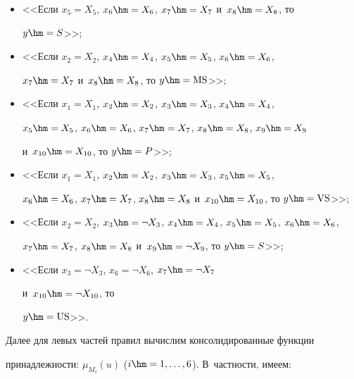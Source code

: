 \begin{itemize}  

\item[$e_1$:] <<Если $x_5=X_5$, $x_6\hm=X_6$, $x_7\hm=X_7$ и~$x_8\hm=X_8$, то 

$y\hm=S$>>; 

  

\item[$e_2$:] <<Если $x_2 = X_2$, $x_4 \hm=X_4$, $x_5\hm=X_5$, $x_6\hm=X_6$, 

$x_7\hm=X_7$ и~$x_8\hm=X_8$, то $y\hm= \mathrm{MS}$>>; 

  

\item[$e_3$:] <<Если $x_1 = X_1$, $x_2\hm=X_2$, $x_3\hm= X_3$, $x_4\hm= X_4$, 

$x_5\hm=X_5$, $x_6\hm= X_6$, $x_7 \hm= X_7$, $x_8\hm=X_8$, $x_9\hm=X_9$ 

и~$x_{10}\hm=X_{10}$, то $y\hm= P$>>; 

  

\item[$e_4$:] <<Если $x_1 = X_1$, $x_2\hm= X_2$, $x_3\hm=X_3$, $x_5\hm= X_5$, 

$x_6\hm= X_6$, $x_7\hm= X_7$, $x_8\hm= X_8$ и~$x_{10}\hm=X_{10}$, то $y\hm=\mathrm{VS}$>>; 

  

\item[$e_5$:] <<Если $x_2=X_2$, $x_3\hm= \neg X_3$, $x_4\hm=X_4$, $x_5\hm=X_5$, $x_6\hm=X_6$, 

$x_7\hm=X_7$, $x_8\hm=X_8$ и~$x_9\hm=\neg X_9$, то $y\hm=S$>>; 

  

\item[$e_6$:] <<Если $x_3 = \neg X_3$, $x_6=\neg X_6$, $x_7\hm =\neg X_7$ 

и~$x_{10}\hm=\neg X_{10}$, то 

$y\hm=\mathrm{US}$>>. 

\end{itemize}

  

  Далее для левых частей правил вычислим консолидированные функции 

принадлежности: $\mu_{M_i}(u)$ ($i\hm=1, \ldots ,6$). В~частности, имеем: 

